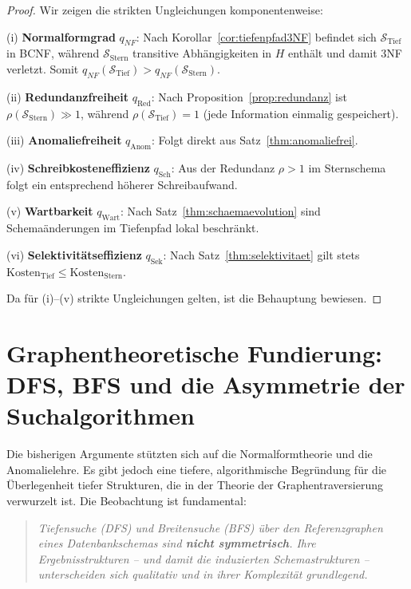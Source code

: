 ﻿\documentclass[a4paper,12pt]{report}
\theoremstyle{definition}
\theoremstyle{remark}
\newcommand{\NF}{\mathit{NF}}
\begin{document}
\begin{proof}
Wir zeigen die strikten Ungleichungen komponentenweise:

\medskip
(i) \textbf{Normalformgrad} $q_{\NF}$: Nach Korollar~\ref{cor:tiefenpfad3NF}
befindet sich $\mathcal{S}_{\text{Tief}}$ in BCNF, während
$\mathcal{S}_{\text{Stern}}$ transitive Abhängigkeiten in $H$ enthält
und damit 3NF verletzt. Somit $q_{\NF}(\mathcal{S}_{\text{Tief}}) > q_{\NF}(\mathcal{S}_{\text{Stern}})$.

(ii) \textbf{Redundanzfreiheit} $q_{\text{Red}}$: Nach Proposition~\ref{prop:redundanz}
ist $\rho(\mathcal{S}_{\text{Stern}}) \gg 1$, während
$\rho(\mathcal{S}_{\text{Tief}}) = 1$ (jede Information einmalig gespeichert).

(iii) \textbf{Anomaliefreiheit} $q_{\text{Anom}}$: Folgt direkt aus
Satz~\ref{thm:anomaliefrei}.

(iv) \textbf{Schreibkosteneffizienz} $q_{\text{Sch}}$: Aus der Redundanz
$\rho > 1$ im Sternschema folgt ein entsprechend höherer Schreibaufwand.

(v) \textbf{Wartbarkeit} $q_{\text{Wart}}$: Nach Satz~\ref{thm:schaemaevolution}
sind Schemaänderungen im Tiefenpfad lokal beschränkt.

(vi) \textbf{Selektivitätseffizienz} $q_{\text{Sek}}$: Nach
Satz~\ref{thm:selektivitaet} gilt stets
$\text{Kosten}_{\text{Tief}} \leq \text{Kosten}_{\text{Stern}}$.

Da für (i)--(v) strikte Ungleichungen gelten, ist die Behauptung bewiesen.
\end{proof}

\section{Graphentheoretische Fundierung: DFS, BFS und die Asymmetrie der Suchalgorithmen}
\label{sec:dfs_bfs}

Die bisherigen Argumente stützten sich auf die Normalformtheorie und die
Anomalielehre. Es gibt jedoch eine tiefere, algorithmische Begründung für
die Überlegenheit tiefer Strukturen, die in der Theorie der Graphentraversierung
verwurzelt ist. Die Beobachtung ist fundamental:

\begin{quote}
\emph{Tiefensuche (DFS) und Breitensuche (BFS) über den Referenzgraphen eines
Datenbankschemas sind \textbf{nicht symmetrisch}. Ihre Ergebnisstrukturen --
und damit die induzierten Schemastrukturen -- unterscheiden sich qualitativ
und in ihrer Komplexität grundlegend.}
\end{quote}
\end{document}
